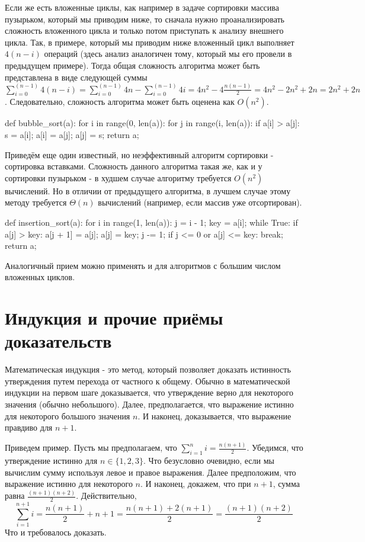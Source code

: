 Если же есть вложенные циклы, как например в задаче сортировки массива пузырьком, 
который мы приводим ниже, то сначала нужно проанализировать сложность 
вложенного цикла и только потом приступать к анализу внешнего цикла. Так, в примере,
который мы приводим ниже вложенный цикл выполняет $4(n-i)$ операций 
(здесь анализ аналогичен тому, который мы его 
провели в предыдущем примере). Тогда общая сложность
алгоритма может быть представлена в виде следующей суммы 
$\sum_{i=0}^{(n-1)}4(n-i) = \sum_{i=0}^{(n-1)}4n - \sum_{i=0}^{(n-1)}4i = 4n^2 - 4\frac{n(n-1)}{2} = 4n^2-2n^2 + 2n=2n^2 + 2n$.
Следовательно, сложность алгоритма может быть оценена как $O(n^2)$.

\begin{python}
def bubble_sort(a):
	for i in range(0, len(a)):
		for j in range(i, len(a)):
			if a[i] > a[j]:
				s = a[i];
				a[i] = a[j];
				a[j] = s;
	return a;
\end{python}

Приведём еще один известный, но неэффективный алгоритм сортировки - сортировка вставками. Сложность
данного алгоритма такая же, как и у сортировки пузырьком - в худшем случае алгоритму требуется $O(n^2)$
вычислений. Но в отличии от предыдущего алгоритма, в лучшем случае этому методу требуется $\Theta(n)$ вычислений
(например, если массив уже отсортирован).

\begin{python}
def insertion_sort(a):
	for i in range(1, len(a)):
		j = i - 1;
		key = a[i];
		while True:
			if a[j] > key:
				a[j + 1] = a[j];				
				a[j] = key;
				j -= 1;
			if j <= 0 or a[j] <= key:
				break;
	return a;
\end{python}


Аналогичный прием можно применять и для алгоритмов с большим числом вложенных
циклов.

\section{Индукция и прочие приёмы доказательств}

Математическая индукция - это метод, который позволяет доказать истинность утверждения
путем перехода от частного к общему. Обычно в математической индукции на первом шаге
доказывается, что утверждение верно для некоторого значения (обычно небольшого). Далее,
предполагается, что выражение истинно для некоторого большого значения $n$. И наконец, 
доказывается, что выражение правдиво для $n+1$.

Приведем пример. Пусть мы предполагаем, что $\sum_{i=1}^n i=\frac{n(n+1)}{2}$. Убедимся, что утверждение
истинно для $n \in \{1, 2, 3\}$. Что безусловно очевидно, если мы вычислим сумму используя левое и правое выражения.
Далее предположим, что выражение истинно для некоторого $n$. И наконец, докажем, что при $n+1$, сумма равна $\frac{(n+1)(n+2)}{2}$. Действительно, $$\sum_{i=1}^{n+1} i=\frac{n(n+1)}{2} + n+1 = \frac{n(n+1) + 2(n+1)}{2} = \frac{(n+1)(n+2)}{2}$$ Что и требовалось доказать.

